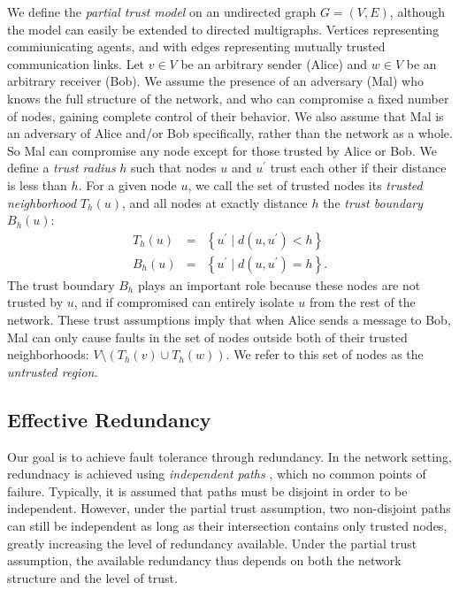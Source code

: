 \documentclass{sig-alternate-05-2015}
\newcommand{\beq}{\begin{eqnarray}}
\newcommand{\eeq}{\end{eqnarray}}
\begin{document}
We define the {\em partial trust model} on
an undirected graph $G = (V,E)$,
although the model can easily be extended to directed multigraphs.
Vertices representing commiunicating agents,
and with edges representing mutually trusted communication links.
Let $v \in V$ be an arbitrary sender (Alice)
and $w \in V$ be an arbitrary receiver (Bob).
We assume the presence of an adversary (Mal) who knows the
full structure of the network,
and who can compromise a fixed number of nodes,
gaining complete control of their behavior.
We also assume that Mal is an adversary of Alice and/or Bob specifically,
rather than the network as a whole.
So Mal can compromise any node except for those trusted by Alice or Bob.
We define a {\em trust radius} $h$ such that nodes $u$ and
$u^\prime$ trust each other if their distance is less than $h$.
For a given node $u$,
we call the set of trusted nodes its
{\em trusted neighborhood} $T_h(u)$,
and all nodes at exactly distance $h$ the
{\em trust boundary} $B_h(u)$:
\beq
T_h(u) &=& \left\{ u^\prime \mid d(u,u^\prime) < h \right\} \\
B_h(u) &=& \left\{ u^\prime \mid d(u,u^\prime) = h \right\}.
\eeq
The trust boundary $B_h$ plays an important role because these nodes are not
trusted by $u$,
and if compromised can entirely isolate $u$ from the rest of the network.
These trust assumptions imply that when Alice sends a message to Bob,
Mal can only cause faults in the set of nodes outside both of their trusted
neighborhoods: $V \setminus \left(T_h(v) \cup T_h(w)\right)$.
We refer to this set of nodes as the {\em untrusted region}.

\subsection{Effective Redundancy}

Our goal is to achieve fault tolerance through redundancy.
In the network setting, redundnacy is achieved using
{\em independent paths} \cite{reiter_resilient_1998},
which no common points of failure.
Typically, it is assumed that paths must be disjoint in order to be
independent.
However, under the partial trust assumption, two non-disjoint paths
can still be independent as long as their intersection contains only trusted
nodes,
greatly increasing the level of redundancy available.
Under the partial trust assumption, the available redundancy thus depends on
both the network structure and the level of trust.
\end{document}
